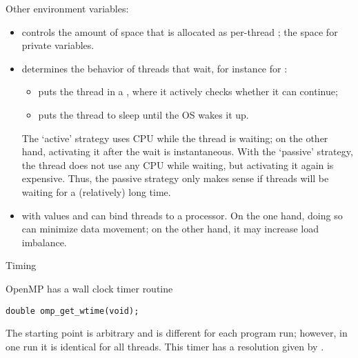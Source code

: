 Other environment variables:
\begin{itemize}
\item {} controls the amount of space that is
  allocated as per-thread ; the space for private
  variables.
\item {} determines the behavior of
  threads that wait, for instance for :
  \begin{itemize}
  \item {} puts the thread in a , where
    it actively checks whether it can continue;
  \item {} puts the thread to sleep until the \ac{OS} wakes
    it up.
  \end{itemize}
  The `active' strategy uses CPU while the thread is waiting; on the
  other hand, activating it after the wait is instantaneous. With the
  `passive' strategy, the thread does not use any CPU while waiting,
  but activating it again is expensive. Thus, the passive strategy
  only makes sense if threads will be waiting for a (relatively) long
  time.
\item {} with values  and 
  can bind threads to a processor. On the one hand, doing so can
  minimize data movement; on the other hand, it may increase load
  imbalance.
\end{itemize}


 {Timing}
\label{sec:omp-timing}

OpenMP has a wall clock timer routine 
\begin{lstlisting}
double omp_get_wtime(void);
\end{lstlisting}
The starting point is arbitrary and is different for each program run;
however, in one run it is identical for all threads.
This timer has a resolution given by .

